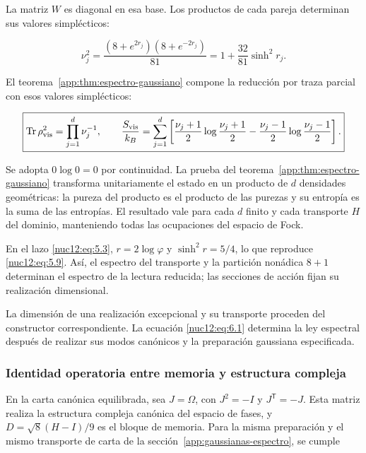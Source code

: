 La matriz \(W\) es diagonal en esa base. Los productos de cada pareja determinan sus valores simplécticos:



\begin{equation}
\boxed{\nu_j^2=
\frac{(8+e^{2r_j})(8+e^{-2r_j})}{81}
=1+\frac{32}{81}\sinh^2r_j.}
\label{nuc12:eq:6.1}
\end{equation}



El teorema~\ref{app:thm:espectro-gaussiano} compone la reducción por traza parcial con esos valores simplécticos:



\begin{equation}
\boxed{\operatorname{Tr}\rho_{\rm vis}^2=\prod_{j=1}^d\nu_j^{-1},
\qquad
\frac{S_{\rm vis}}{k_B}=\sum_{j=1}^d
\left[\frac{\nu_j+1}{2}\log\frac{\nu_j+1}{2}
-\frac{\nu_j-1}{2}\log\frac{\nu_j-1}{2}\right].}
\label{nuc12:eq:6.2}
\end{equation}



Se adopta \(0\log0=0\) por continuidad. La prueba del teorema~\ref{app:thm:espectro-gaussiano} transforma unitariamente el estado en un producto de \(d\) densidades geométricas: la pureza del producto es el producto de las purezas y su entropía es la suma de las entropías. El resultado vale para cada \(d\) finito y cada transporte \(H\) del dominio, manteniendo todas las ocupaciones del espacio de Fock.

En el lazo \eqref{nuc12:eq:5.3}, \(r=2\log\varphi\) y \(\sinh^2r=5/4\), lo que reproduce \eqref{nuc12:eq:5.9}. Así, el espectro del transporte y la partición nonádica \(8+1\) determinan el espectro de la lectura reducida; las secciones de acción fijan su realización dimensional.

La dimensión de una realización excepcional y su transporte proceden del constructor correspondiente. La ecuación \eqref{nuc12:eq:6.1} determina la ley espectral después de realizar sus modos canónicos y la preparación gaussiana especificada.

\subsubsection{Identidad operatoria entre memoria y estructura compleja}

En la carta canónica equilibrada, sea \(J=\Omega\), con \(J^2=-I\) y \(J^{\mathsf T}=-J\). Esta matriz realiza la estructura compleja canónica del espacio de fases, y \(D=\sqrt8(H-I)/9\) es el bloque de memoria. Para la misma preparación y el mismo transporte de carta de la sección~\ref{app:gaussianas-espectro}, se cumple



